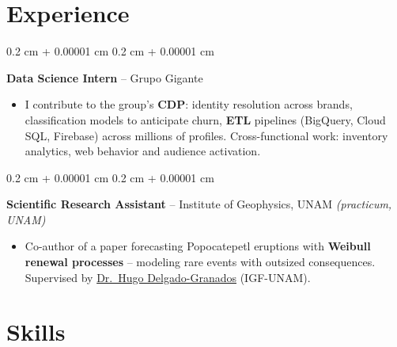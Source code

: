 \documentclass[10pt, letterpaper]{article}
\newenvironment{highlights}{
    \begin{itemize}[
        topsep=0 cm,
        parsep=0.02 cm,
        partopsep=0pt,
        itemsep=0pt,
        leftmargin=0.4 cm + 10pt
    ]
}{
    \end{itemize}
}
\newenvironment{onecolentry}{
    \begin{adjustwidth}{
        0.2 cm + 0.00001 cm
    }{
        0.2 cm + 0.00001 cm
    }
}{
    \end{adjustwidth}
}
\let\hrefWithoutArrow\href
\renewcommand{\href}[2]{\hrefWithoutArrow{#1}{\ifthenelse{\equal{#2}{}}{ }{#2 }\raisebox{.15ex}{\footnotesize \faExternalLink*}}}
\begin{document}
    \section{Experience}

        \begin{onecolentry}
            \textbf{Data Science Intern} -- Grupo Gigante
            \begin{highlights}
                \item I contribute to the group's \textbf{CDP}: identity resolution across brands, classification models to anticipate churn, \textbf{ETL} pipelines (BigQuery, Cloud SQL, Firebase) across millions of profiles. Cross-functional work: inventory analytics, web behavior and audience activation.
            \end{highlights}
            \end{onecolentry}

        \vspace{0.02 cm}

        \begin{onecolentry}
            \textbf{Scientific Research Assistant} -- Institute of Geophysics, UNAM \textit{(practicum, UNAM)}
            \begin{highlights}
                \item Co-author of a paper forecasting Popocatepetl eruptions with \textbf{Weibull renewal processes} -- modeling rare events with outsized consequences. Supervised by \hrefWithoutArrow{https://scholar.google.com/citations?user=lDD0DZQAAAAJ}{Dr.\ Hugo Delgado-Granados} (IGF-UNAM).
            \end{highlights}
            \end{onecolentry}


    \section{Skills}
\end{document}
